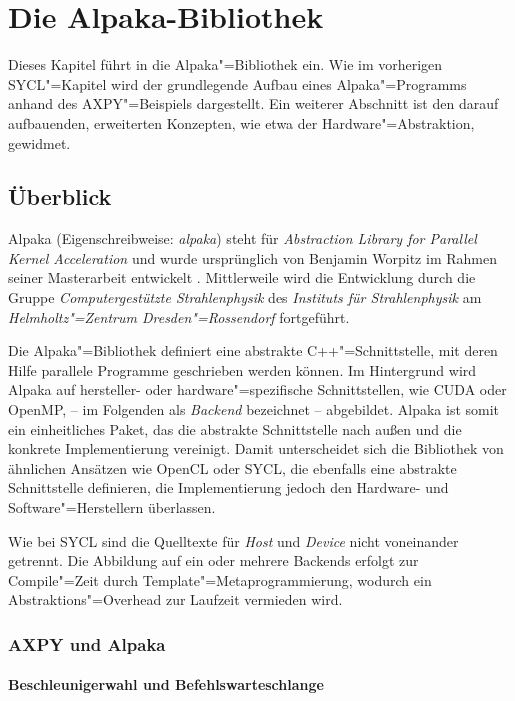 \chapter{Die Alpaka-Bibliothek}\label{alpaka}

Dieses Kapitel führt in die Alpaka"=Bibliothek ein. Wie im vorherigen
SYCL"=Kapitel wird der grundlegende Aufbau eines Alpaka"=Programms anhand des
AXPY"=Beispiels dargestellt. Ein weiterer Abschnitt ist den darauf aufbauenden,
erweiterten Konzepten, wie etwa der Hardware"=Abstraktion, gewidmet.

\section{Überblick}\label{alpaka:ueberblick}

Alpaka (Eigenschreibweise: \textit{alpaka}) steht für
\textit{Abstraction Library for Parallel Kernel Acceleration} und wurde
ursprünglich von Benjamin Worpitz im Rahmen seiner Masterarbeit entwickelt
\cite[vgl.][]{worpitz2015}. Mittlerweile wird die Entwicklung durch
die Gruppe \textit{Computergestützte Strahlenphysik} des
\textit{Instituts für Strahlenphysik} am
\textit{Helmholtz"=Zentrum Dresden"=Rossendorf} fortgeführt.

Die Alpaka"=Bibliothek definiert eine abstrakte C++"=Schnittstelle, mit deren
Hilfe parallele Programme geschrieben werden können. Im Hintergrund wird Alpaka
auf hersteller- oder hardware"=spezifische Schnittstellen, wie CUDA oder OpenMP,
-- im Folgenden als \textit{Backend} bezeichnet -- abgebildet. Alpaka ist somit
ein einheitliches Paket, das die abstrakte Schnittstelle nach außen und die
konkrete Implementierung vereinigt. Damit unterscheidet sich die Bibliothek von
ähnlichen Ansätzen wie OpenCL oder SYCL, die ebenfalls eine abstrakte
Schnittstelle definieren, die Implementierung jedoch den Hardware- und
Software"=Herstellern überlassen.

Wie bei SYCL sind die Quelltexte für \textit{Host} und \textit{Device} nicht
voneinander getrennt. Die Abbildung auf ein oder mehrere Backends erfolgt zur
Compile"=Zeit durch Template"=Metaprogrammierung, wodurch ein
Abstraktions"=Overhead zur Laufzeit vermieden wird.

\subsection{AXPY und Alpaka}\label{alpaka:ueberblick:axpy}

\subsubsection{Beschleunigerwahl und Befehlswarteschlange}
\label{alpaka:ueberblick:axpy:queue}

